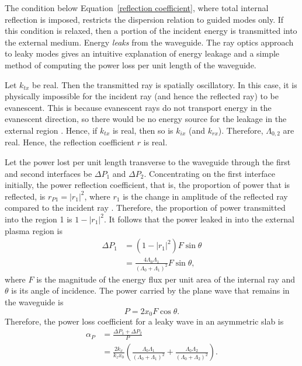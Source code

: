 \documentclass[12pt]{../style-files/ociamthesis}
\begin{document}
	The condition below Equation~\eqref{reflection coefficient}, where total internal reflection is imposed, restricts the dispersion relation to guided modes only. If this condition is relaxed, then a portion of the incident energy is transmitted into the external medium. Energy \textit{leaks} from the waveguide. The ray optics approach to leaky modes gives an intuitive explanation of energy leakage and a simple method of computing the power loss per unit length of the waveguide.
	
	Let $k_{tx}$ be real. Then the transmitted ray is spatially oscillatory. In this case, it is physically impossible for the incident ray (and hence the reflected ray) to be evanescent. This is because evanescent rays do not transport energy in the evanescent direction, so there would be no energy source for the leakage in the external region \citep{goe_etal04}. Hence, if $k_{tx}$ is real, then so is $k_{ix}$ (and $k_{rx}$). Therefore, $\Lambda_{0, 2}$ are real. Hence, the reflection coefficient $r$ is real.
	
	Let the power lost per unit length transverse to the waveguide through the first and second interfaces be $\Delta P_1$ and $\Delta P_2$. Concentrating on the first interface initially, the power reflection coefficient, that is, the proportion of power that is reflected, is $r_{P1} = |r_1|^2$, where $r_1$ is the change in amplitude of the reflected ray compared to the incident ray \citep{mar74}. Therefore, the proportion of power transmitted into the region 1 is $1 - |r_1|^2$. It follows that the power leaked in into the external plasma region is
	\begin{align}
	\Delta P_1 &= (1 - |r_1|^2)F\sin{\theta} \\
	&= \frac{4\Lambda_0\Lambda_1}{(\Lambda_0 + \Lambda_1)^2}F\sin{\theta},
	\end{align}
	where $F$ is the magnitude of the energy flux per unit area of the internal ray and $\theta$ is its angle of incidence. The power carried by the plane wave that remains in the waveguide is
	\begin{equation}
	P = 2x_0F\cos{\theta}.
	\end{equation}
	Therefore, the power loss coefficient for a leaky wave in an asymmetric slab is
	\begin{align}
	\alpha_P &= \frac{\Delta P_1 + \Delta P_2}{P} \\
	&= \frac{2k_x}{k_zx_0}\left( \frac{\Lambda_0\Lambda_1}{(\Lambda_0 + \Lambda_1)^2} + \frac{\Lambda_0\Lambda_2}{(\Lambda_0 + \Lambda_2)^2} \right).
	\end{align}
	
\end{document}
